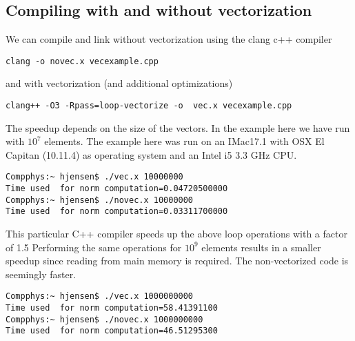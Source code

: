 \subsection*{Compiling with and without vectorization}
We can compile and link without vectorization using the clang c++ compiler


\begin{verbatim}
clang -o novec.x vecexample.cpp

\end{verbatim}

and with vectorization (and additional optimizations)


\begin{verbatim}
clang++ -O3 -Rpass=loop-vectorize -o  vec.x vecexample.cpp 

\end{verbatim}

The speedup depends on the size of the vectors. In the example here we have run with $10^7$ elements.
The example here was run on an IMac17.1 with OSX El Capitan (10.11.4) as operating system and an Intel i5 3.3 GHz CPU.  





\begin{verbatim}
Compphys:~ hjensen$ ./vec.x 10000000
Time used  for norm computation=0.04720500000
Compphys:~ hjensen$ ./novec.x 10000000
Time used  for norm computation=0.03311700000

\end{verbatim}

This particular C++ compiler speeds up the above loop operations with a factor of 1.5 
Performing the same operations for $10^9$ elements results in a smaller speedup since reading from main memory is required. The non-vectorized code is seemingly faster. 





\begin{verbatim}
Compphys:~ hjensen$ ./vec.x 1000000000
Time used  for norm computation=58.41391100
Compphys:~ hjensen$ ./novec.x 1000000000
Time used  for norm computation=46.51295300

\end{verbatim}

